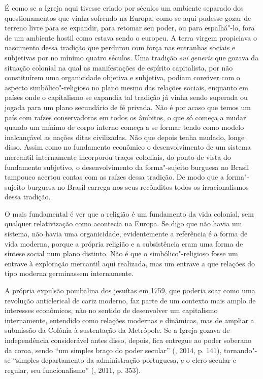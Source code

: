 É como se a Igreja aqui tivesse criado por séculos um ambiente separado
dos questionamentos que vinha sofrendo na Europa, como se aqui pudesse
gozar de terreno livre para se expandir, para retomar seu poder, ou para
espalhá"-lo, fora de um ambiente hostil como estava sendo o europeu. A
terra virgem propiciava o nascimento dessa tradição que perdurou com
força nas entranhas sociais e subjetivas por no mínimo quatro séculos.
Uma tradição \emph{sui} \emph{generis} que gozava da situação colonial
na qual as manifestações de espírito capitalista, por não constituírem
uma organicidade objetiva e subjetiva, podiam conviver com o aspecto
simbólico"-religioso no plano mesmo das relações sociais, enquanto em
países onde o capitalismo se expandia tal tradição já vinha sendo
superada ou jogada para um plano secundário de fé privada. Não é por
acaso que temos um país com raízes conservadoras em todos os âmbitos, o
que só começa a mudar quando um mínimo de corpo interno começa a se
formar tendo como modelo inalcançável as nações ditas civilizadas. Não
que depois tenha mudado, longe disso. Assim como no fundamento econômico
o desenvolvimento de um sistema mercantil internamente incorporou traços
coloniais, do ponto de vista do fundamento subjetivo, o desenvolvimento
da forma"-sujeito burguesa no Brasil tampouco acertou contas com as
raízes dessa tradição. De modo que a forma"-sujeito burguesa no Brasil
carrega nos seus recônditos todos os irracionalismos dessa tradição.

O mais fundamental é ver que a religião é um fundamento da vida
colonial, sem qualquer relativização como acontecia na Europa. Se
digo que não havia um sistema, não havia uma organicidade,
evidentemente a referência é a forma de vida moderna, porque a própria
religião e a subsistência eram uma forma de síntese social num plano
distinto. Não é que o simbólico"-religioso fosse um entrave à exploração
mercantil aqui realizada, mas um entrave a que relações do tipo moderna
germinassem internamente.

A própria expulsão pombalina dos jesuítas em 1759, que poderia soar como
uma revolução anticlerical de cariz moderno, faz parte de um contexto
mais amplo de interesses econômicos, não no sentido de desenvolver um
capitalismo internamente, entendido como relações modernas e dinâmicas,
mas de ampliar a submissão da Colônia à sustentação da Metrópole. Se a
Igreja gozava de independência considerável antes disso, depois, fica
entregue ao poder soberano da coroa, sendo ``um simples braço do poder
secular'' (, 2014, p. 141), tornando"-se ``simples departamento da
administração portuguesa, e o clero secular e regular, seu
funcionalismo'' (, 2011, p. 353).

